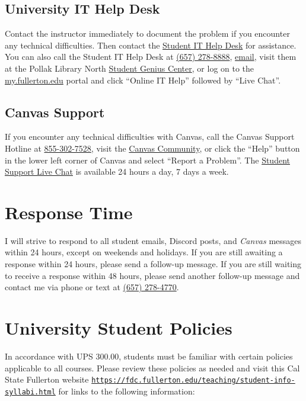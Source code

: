 \documentclass[12pt, letterpaper]{article}
\begin{document}
\subsection*{University IT Help Desk}

Contact the instructor immediately to document the problem if you encounter any technical difficulties. Then contact the \href{http://www.fullerton.edu/it/students/helpdesk/index.php}{Student IT Help Desk} for assistance. You can also call the Student IT Help Desk at \href{tel:+16572788888}{(657) 278-8888}, \href{mailto:StudentITHelpDesk@fullerton.edu}{email}, visit them at the Pollak Library North \href{http://www.fullerton.edu/it/students/sgc/index.php}{Student Genius Center}, or log on to the \href{http://my.fullerton.edu/}{my.fullerton.edu} portal and click ``Online IT Help'' followed by ``Live Chat''.

\subsection*{Canvas Support}

If you encounter any technical difficulties with Canvas, call the Canvas Support Hotline at \href{tel:+18553027528}{855-302-7528}, visit the \href{https://community.canvaslms.com/docs/DOC-10720-67952720329}{Canvas Community}, or click the ``Help'' button in the lower left corner of Canvas and select ``Report a Problem''. The \href{https://cases.canvaslms.com/liveagentchat?chattype=student&sfid=001A000000YzcwQIAR}{Student Support Live Chat} is available 24 hours a day, 7 days a week.

\section{Response Time} I will strive to respond to all student emails, Discord posts, and \emph{Canvas} messages within 24 hours, except on weekends and holidays. If you are still awaiting a response within 24 hours, please send a follow-up message. If you are still waiting to receive a response within 48 hours, please send another follow-up message and contact me via phone or text at \href{tel:+16572784770}{(657) 278-4770}.


\section{University Student Policies}

In accordance with UPS 300.00, students must be familiar with certain policies applicable to all courses. Please review these policies as needed and visit this Cal State Fullerton website \texttt{\href{https://fdc.fullerton.edu/teaching/student-info-syllabi.html}{https://fdc.fullerton.edu/teaching/student-info-syllabi.html}} for links to the following information:
\end{document}
